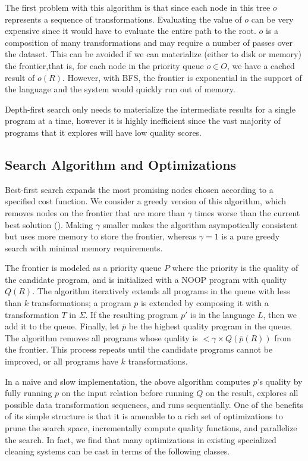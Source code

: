  The first problem with this algorithm is that since each node in this tree $o$ represents a sequence of transformations.
 Evaluating the value of $o$ can be very expensive since it would have to evaluate the entire path to the root.
 $o$ is a composition of many transformations and may require a number of passes over the dataset.
 This can be avoided if we can materialize (either to disk or memory) the frontier,that is, for each node in the priority queue $o \in O$, we have a cached result of $o(R)$. 
 However, with BFS, the frontier is exponential in the support of the language and the system would quickly run out of memory.

 Depth-first search only needs to materialize the intermediate results for a single program at a time, however it is highly inefficient since the vast majority of programs that it explores will have low quality scores.  


\subsection*{Search Algorithm and Optimizations}
Best-first search expands the most promising nodes chosen according to a specified cost function.
We consider a greedy version of this algorithm, which removes nodes on the frontier that are more than $\gamma$ times worse than the current best solution ().
Making $\gamma$ smaller makes the algorithm asympotically consistent but uses more memory to store the frontier, whereas $\gamma=1$ is a pure greedy search with minimal memory requirements.  

The frontier is modeled as a priority queue $P$ where the priority is the quality of the candidate program, and is initialized with a NOOP program with quality $Q(R)$.  
The algorithm iteratively extends all programs in the queue with less than $k$ transformations; a program $p$ is extended by composing it with a transformation $T$ in $\Sigma$.  If the resulting program $p'$ is in the language $L$, then we add it to the queue.
Finally, let $\bar{p}$ be the highest quality program in the queue.  The algorithm removes all programs whose quality is $<\gamma\times Q(\bar{p}(R))$ from the frontier.  
This process repeats until the candidate programs cannot be improved, or all programs have $k$ transformations.

In a naive and slow implementation, the above algorithm computes $p$'s quality by fully running $p$ on the input relation before running $Q$ on the result, explores all possible data transformation sequences, and runs sequentially.  One of the benefits of its simple structure is that it is amenable to a rich set of optimizations to prune the search space, incrementally compute quality functions, and parallelize the search.  In fact, we find that many optimizations in existing specialized cleaning systems can be cast in terms of the following classes.

